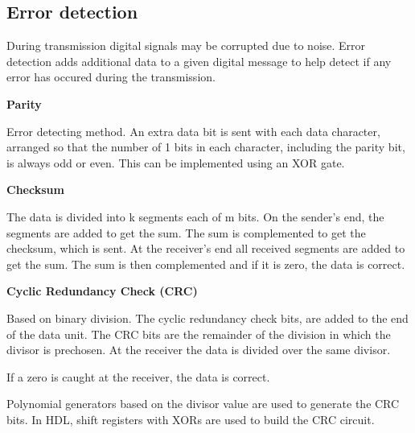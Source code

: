 \subsection{Error detection}

During transmission digital signals may be corrupted due
to noise. Error detection adds additional data to a given digital
message to help detect if any error has occured during the transmission.


\textbf{Parity}

Error detecting method. An extra data bit is sent with each data
character, arranged so that the number of 1 bits in each character,
including the parity bit, is always odd or even. This can be implemented
using an XOR gate.

\textbf{Checksum}

The data is divided into k segments each of m bits.
On the sender's end, the segments are added to get the sum.
The sum is complemented to get the checksum, which is sent.
At the receiver's end all received segments are added to get the sum.
The sum is then complemented and if it is zero, the data is correct.

\textbf{Cyclic Redundancy Check (CRC)}

Based on binary division.
The cyclic redundancy check bits, are added to the end
of the data unit.
The CRC bits are the remainder of the division in which the divisor
is prechosen.
At the receiver the data is divided over the same divisor.

If a zero is caught at the receiver, the data is correct.

Polynomial generators based on the divisor value are used to generate
the CRC bits. In HDL, shift registers with XORs are used to build
the CRC circuit.

